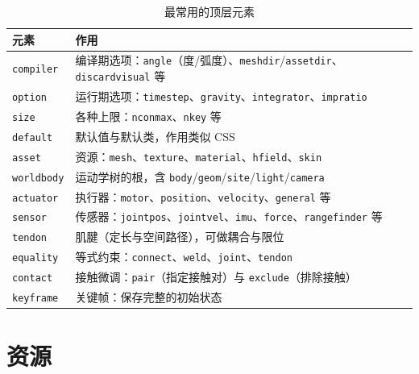 \begin{table}[H]
	\centering
	\caption{最常用的顶层元素}
	\label{tab:App:MJCF}
	\footnotesize
	\begin{tabular}{>{\raggedright\arraybackslash}p{3.4cm}>{\raggedright\arraybackslash}p{10.8cm}}
		\hline
		元素 & 作用 \\
		\hline
		\texttt{compiler} & 编译期选项：\texttt{angle}（度/弧度）、\texttt{meshdir}/\texttt{assetdir}、\texttt{discardvisual} 等 \\
		\texttt{option} & 运行期选项：\texttt{timestep}、\texttt{gravity}、\texttt{integrator}、\texttt{impratio} \\
		\texttt{size} & 各种上限：\texttt{nconmax}、\texttt{nkey} 等 \\
		\texttt{default} & 默认值与默认类，作用类似 CSS \\
		\texttt{asset} & 资源：\texttt{mesh}、\texttt{texture}、\texttt{material}、\texttt{hfield}、\texttt{skin} \\
		\texttt{worldbody} & 运动学树的根，含 \texttt{body}/\texttt{geom}/\texttt{site}/\texttt{light}/\texttt{camera} \\
		\texttt{actuator} & 执行器：\texttt{motor}、\texttt{position}、\texttt{velocity}、\texttt{general} 等 \\
		\texttt{sensor} & 传感器：\texttt{jointpos}、\texttt{jointvel}、\texttt{imu}、\texttt{force}、\texttt{rangefinder} 等 \\
		\texttt{tendon} & 肌腱（定长与空间路径），可做耦合与限位 \\
		\texttt{equality} & 等式约束：\texttt{connect}、\texttt{weld}、\texttt{joint}、\texttt{tendon} \\
		\texttt{contact} & 接触微调：\texttt{pair}（指定接触对）与 \texttt{exclude}（排除接触） \\
		\texttt{keyframe} & 关键帧：保存完整的初始状态 \\
		\hline
	\end{tabular}
\end{table}

\section{资源}

